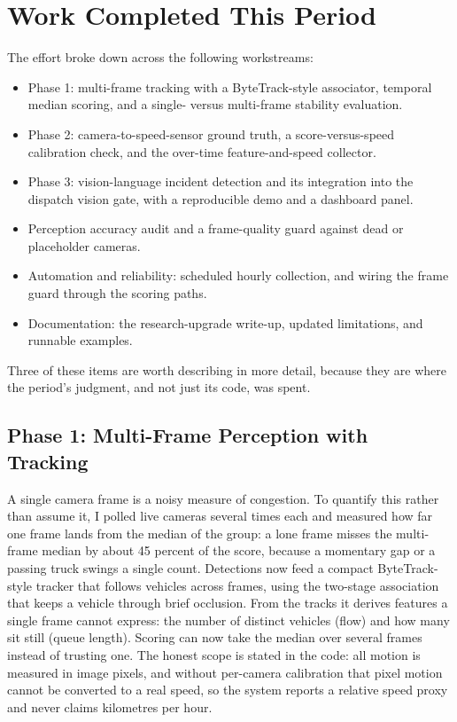 \documentclass[12pt]{article}
\begin{document}
\section{Work Completed This Period}

The effort broke down across the following workstreams:

\begin{itemize}[leftmargin=1.6em, itemsep=3pt]
  \item Phase 1: multi-frame tracking with a ByteTrack-style associator, temporal
    median scoring, and a single- versus multi-frame stability evaluation.
  \item Phase 2: camera-to-speed-sensor ground truth, a score-versus-speed
    calibration check, and the over-time feature-and-speed collector.
  \item Phase 3: vision-language incident detection and its integration into the
    dispatch vision gate, with a reproducible demo and a dashboard panel.
  \item Perception accuracy audit and a frame-quality guard against dead or
    placeholder cameras.
  \item Automation and reliability: scheduled hourly collection, and wiring the
    frame guard through the scoring paths.
  \item Documentation: the research-upgrade write-up, updated limitations, and
    runnable examples.
\end{itemize}

Three of these items are worth describing in more detail, because they are where
the period's judgment, and not just its code, was spent.

\subsection{Phase 1: Multi-Frame Perception with Tracking}

A single camera frame is a noisy measure of congestion. To quantify this rather
than assume it, I polled live cameras several times each and measured how far one
frame lands from the median of the group: a lone frame misses the multi-frame
median by about 45 percent of the score, because a momentary gap or a passing
truck swings a single count. Detections now feed a compact ByteTrack-style
tracker that follows vehicles across frames, using the two-stage association that
keeps a vehicle through brief occlusion. From the tracks it derives features a
single frame cannot express: the number of distinct vehicles (flow) and how many
sit still (queue length). Scoring can now take the median over several frames
instead of trusting one. The honest scope is stated in the code: all motion is
measured in image pixels, and without per-camera calibration that pixel motion
cannot be converted to a real speed, so the system reports a relative speed proxy
and never claims kilometres per hour.
\end{document}
